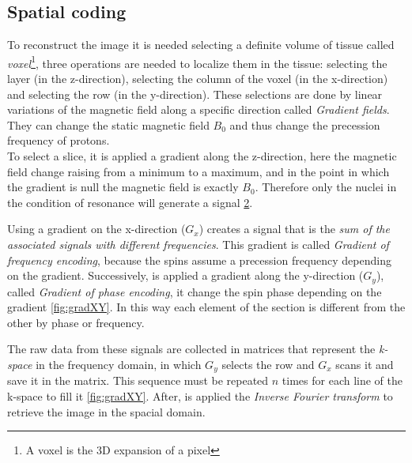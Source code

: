  \begin{figure}[h]
    \centering
    \caption{}
    \label{fig:matrixTR_TE}
 \end{figure}

 \subsection{Spatial coding}
 To reconstruct the image it is needed selecting a definite volume of tissue called \emph{voxel}\footnote{A voxel is the 3D expansion of a pixel}, three operations are needed to localize them in the tissue: selecting the layer (in the z-direction), selecting the column of the voxel (in the x-direction) and selecting the row (in the y-direction).
 These selections are done by linear variations of the magnetic field along a specific direction called \emph{Gradient fields}. They can change the static magnetic field $B_0$ and thus change the precession frequency of protons.\\
 
 \noindent To select a slice, it is applied a gradient along the z-direction, here the magnetic field change raising from a minimum to a maximum, and in the point in which the gradient is null the magnetic field is exactly $B_0$. Therefore only the nuclei in the condition of resonance will generate a signal \ref{fig:gradientZ}.

 \begin{figure}[h]
    \centering
    \caption{}
    \label{fig:gradientZ}
 \end{figure}

 \noindent Using a gradient on the x-direction ($G_x$) creates a signal that is the \emph{sum of the associated signals with different frequencies}. This gradient is called \emph{Gradient of frequency encoding}, because the spins assume a precession frequency depending on the gradient. Successively, is applied a gradient along the y-direction ($G_y$), called \emph{Gradient of phase encoding}, it change the spin phase depending on the gradient \ref{fig:gradXY}. In this way each element of the section is different from the other by phase or frequency.

 The raw data from these signals are collected in matrices that represent the \emph{k-space} in the frequency domain, in which $G_y$ selects the row and $G_x$ scans it and save it in the matrix.
 This sequence must be repeated $n$ times for each line of the k-space to fill it \ref{fig:gradXY}.
 After, is applied the \emph{Inverse Fourier transform} to retrieve the image in the spacial domain.

